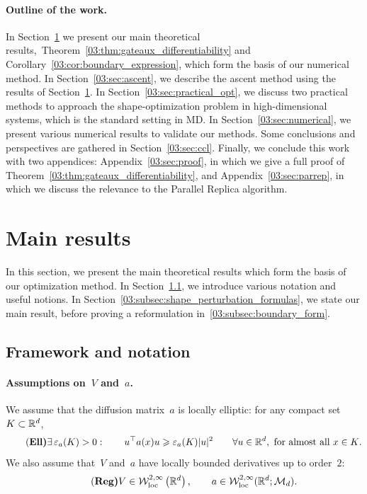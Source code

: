     \paragraph{Outline of the work.}
    In Section~\ref{03:sec:main_result} we present our main theoretical results,~Theorem~\ref{03:thm:gateaux_differentiability} and Corollary~\ref{03:cor:boundary_expression}, which form the basis of our numerical method.
    In Section~\ref{03:sec:ascent}, we describe the ascent method using the results of Section~\ref{03:sec:main_result}.
    In Section~\ref{03:sec:practical_opt}, we discuss two practical methods to approach the shape-optimization problem in high-dimensional systems, which is the standard setting in MD.
    In Section~\ref{03:sec:numerical}, we present various numerical results to validate our methods.
    Some conclusions and perspectives are gathered in Section~\ref{03:sec:ccl}. Finally, we conclude this work with two appendices: Appendix~\ref{03:sec:proof}, in which we give a full proof of Theorem~\ref{03:thm:gateaux_differentiability}, and Appendix~\ref{03:sec:parrep}, in which we discuss the relevance to the Parallel Replica algorithm.

    \section{Main results}
    \label{03:sec:main_result}
    In this section, we present the main theoretical results which form the basis of our optimization method. In Section~\ref{03:subsec:framework}, we introduce various notation and useful notions. In Section~\ref{03:subsec:shape_perturbation_formulas}, we state our main result, before proving a reformulation in~\ref{03:subsec:boundary_form}.

    \subsection{Framework and notation}
    \label{03:subsec:framework}
        \paragraph{Assumptions on~$V$ and~$a$.}
        We assume that the diffusion matrix~$a$ is locally elliptic: for any compact set~$K\subset \mathbb{R}^d$,
        \begin{equation}
            \label{03:eq:a_ellipticity}
            \tag{\bf Ell}
            \exists\,\varepsilon_a(K)>0:\qquad u^\top a(x) u \geqslant \varepsilon_a(K) |u|^2\qquad\forall u\in \mathbb{R}^d,\text{ for almost all~$x\in K$}.
        \end{equation}
        We also assume that~$V$ and~$a$ have locally bounded derivatives up to order~$2$:
        \begin{equation}
            \label{03:eq:coeff_regularity}
            \tag{\bf Reg}
            V\in \mathcal{W}_{\mathrm{loc}}^{2,\infty}\left(\mathbb{R}^d\right),\qquad a\in \mathcal{W}_{\mathrm{loc}}^{2,\infty}(\mathbb{R}^d;\mathcal M_d).
        \end{equation}
